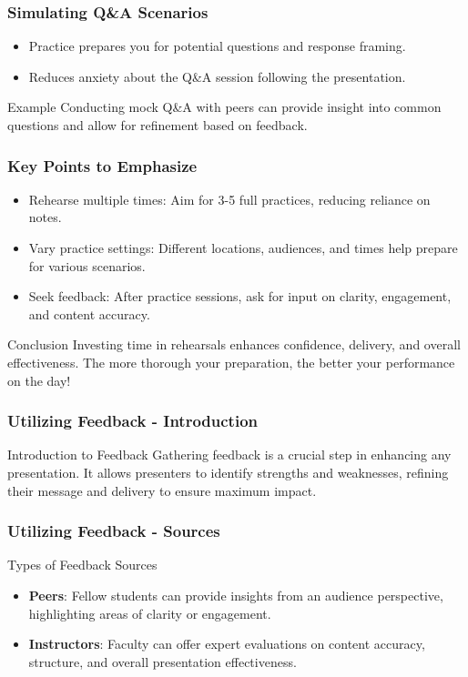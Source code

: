 \documentclass[aspectratio=169]{beamer}
\begin{document}
\begin{frame}[fragile]
    \frametitle{Simulating Q\&A Scenarios}
    \begin{itemize}
        \item Practice prepares you for potential questions and response framing.
        \item Reduces anxiety about the Q\&A session following the presentation.
    \end{itemize}
    \begin{exampleblock}{Example}
        Conducting mock Q\&A with peers can provide insight into common questions and allow for refinement based on feedback.
    \end{exampleblock}
\end{frame}

\begin{frame}[fragile]
    \frametitle{Key Points to Emphasize}
    \begin{itemize}
        \item Rehearse multiple times: Aim for 3-5 full practices, reducing reliance on notes.
        \item Vary practice settings: Different locations, audiences, and times help prepare for various scenarios.
        \item Seek feedback: After practice sessions, ask for input on clarity, engagement, and content accuracy.
    \end{itemize}
    \begin{block}{Conclusion}
        Investing time in rehearsals enhances confidence, delivery, and overall effectiveness. The more thorough your preparation, the better your performance on the day!
    \end{block}
\end{frame}

\begin{frame}[fragile]
    \frametitle{Utilizing Feedback - Introduction}
    \begin{block}{Introduction to Feedback}
        Gathering feedback is a crucial step in enhancing any presentation. It allows presenters to identify strengths and weaknesses, refining their message and delivery to ensure maximum impact.
    \end{block}
\end{frame}

\begin{frame}[fragile]
    \frametitle{Utilizing Feedback - Sources}
    \begin{block}{Types of Feedback Sources}
        \begin{itemize}
            \item \textbf{Peers}: Fellow students can provide insights from an audience perspective, highlighting areas of clarity or engagement.
            \item \textbf{Instructors}: Faculty can offer expert evaluations on content accuracy, structure, and overall presentation effectiveness.
        \end{itemize}
    \end{block}
\end{frame}
\end{document}
